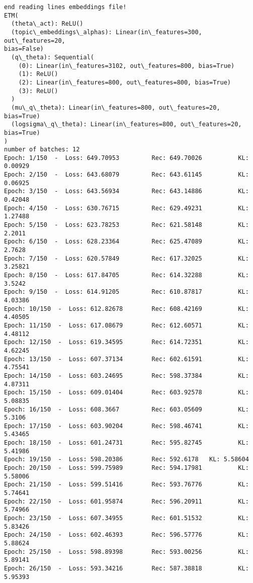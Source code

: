 \documentclass[11pt]{article}
\begin{document}
    \begin{Verbatim}[commandchars=\\\{\}]
end reading lines embeddings file!
ETM(
  (theta\_act): ReLU()
  (topic\_embeddings\_alphas): Linear(in\_features=300, out\_features=20,
bias=False)
  (q\_theta): Sequential(
    (0): Linear(in\_features=3102, out\_features=800, bias=True)
    (1): ReLU()
    (2): Linear(in\_features=800, out\_features=800, bias=True)
    (3): ReLU()
  )
  (mu\_q\_theta): Linear(in\_features=800, out\_features=20, bias=True)
  (logsigma\_q\_theta): Linear(in\_features=800, out\_features=20, bias=True)
)
number of batches: 12
Epoch: 1/150  -  Loss: 649.70953         Rec: 649.70026          KL: 0.00929
Epoch: 2/150  -  Loss: 643.68079         Rec: 643.61145          KL: 0.06925
Epoch: 3/150  -  Loss: 643.56934         Rec: 643.14886          KL: 0.42048
Epoch: 4/150  -  Loss: 630.76715         Rec: 629.49231          KL: 1.27488
Epoch: 5/150  -  Loss: 623.78253         Rec: 621.58148          KL: 2.2011
Epoch: 6/150  -  Loss: 628.23364         Rec: 625.47089          KL: 2.7628
Epoch: 7/150  -  Loss: 620.57849         Rec: 617.32025          KL: 3.25821
Epoch: 8/150  -  Loss: 617.84705         Rec: 614.32288          KL: 3.5242
Epoch: 9/150  -  Loss: 614.91205         Rec: 610.87817          KL: 4.03386
Epoch: 10/150  -  Loss: 612.82678        Rec: 608.42169          KL: 4.40505
Epoch: 11/150  -  Loss: 617.08679        Rec: 612.60571          KL: 4.48112
Epoch: 12/150  -  Loss: 619.34595        Rec: 614.72351          KL: 4.62245
Epoch: 13/150  -  Loss: 607.37134        Rec: 602.61591          KL: 4.75541
Epoch: 14/150  -  Loss: 603.24695        Rec: 598.37384          KL: 4.87311
Epoch: 15/150  -  Loss: 609.01404        Rec: 603.92578          KL: 5.08835
Epoch: 16/150  -  Loss: 608.3667         Rec: 603.05609          KL: 5.3106
Epoch: 17/150  -  Loss: 603.90204        Rec: 598.46741          KL: 5.43465
Epoch: 18/150  -  Loss: 601.24731        Rec: 595.82745          KL: 5.41986
Epoch: 19/150  -  Loss: 598.20386        Rec: 592.6178   KL: 5.58604
Epoch: 20/150  -  Loss: 599.75989        Rec: 594.17981          KL: 5.58006
Epoch: 21/150  -  Loss: 599.51416        Rec: 593.76776          KL: 5.74641
Epoch: 22/150  -  Loss: 601.95874        Rec: 596.20911          KL: 5.74966
Epoch: 23/150  -  Loss: 607.34955        Rec: 601.51532          KL: 5.83426
Epoch: 24/150  -  Loss: 602.46393        Rec: 596.57776          KL: 5.88624
Epoch: 25/150  -  Loss: 598.89398        Rec: 593.00256          KL: 5.89141
Epoch: 26/150  -  Loss: 593.34216        Rec: 587.38818          KL: 5.95393

\end{Verbatim}
\end{document}
